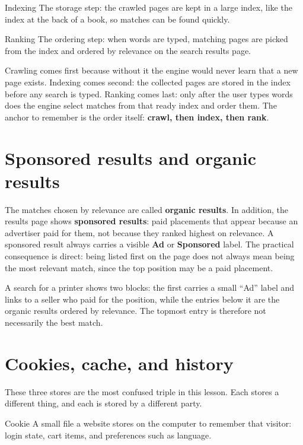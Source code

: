 \begin{definitionbox}{Indexing}
The storage step: the crawled pages are kept in a large index, like the
index at the back of a book, so matches can be found quickly.
\end{definitionbox}

\begin{definitionbox}{Ranking}
The ordering step: when words are typed, matching pages are picked from the
index and ordered by relevance on the search results page.
\end{definitionbox}

Crawling comes first because without it the engine would never learn that a
new page exists. Indexing comes second: the collected pages are stored in the
index before any search is typed. Ranking comes last: only after the user
types words does the engine select matches from that ready index and order
them. The anchor to remember is the order itself: \textbf{crawl, then index,
then rank}.

\section{Sponsored results and organic results}
The matches chosen by relevance are called \textbf{organic results}. In
addition, the results page shows \textbf{sponsored results}: paid placements
that appear because an advertiser paid for them, not because they ranked
highest on relevance. A sponsored result always carries a visible
\textbf{Ad} or \textbf{Sponsored} label. The practical consequence is direct:
being listed first on the page does not always mean being the most relevant
match, since the top position may be a paid placement.

\begin{example}
A search for a printer shows two blocks: the first carries a small ``Ad''
label and links to a seller who paid for the position, while the entries
below it are the organic results ordered by relevance. The topmost entry is
therefore not necessarily the best match.
\end{example}

\section{Cookies, cache, and history}
These three stores are the most confused triple in this lesson. Each stores a
different thing, and each is stored by a different party.

\begin{definitionbox}{Cookie}
A small file a website stores on the computer to remember that visitor:
login state, cart items, and preferences such as language.
\end{definitionbox}

